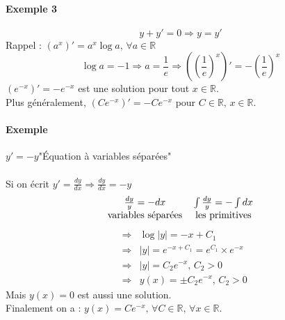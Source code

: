 \documentclass[1Opt]{report}
\begin{document}
\paragraph{Exemple 3}
\[y+y'=0\Rightarrow y=y'\]
Rappel : $(a^x)'=a^x\log{a}, \, \forall a\in{\mathbb R}$
\[\log{a}=-1\Rightarrow a=\frac{1}{e}\Rightarrow \left(\left(\frac{1}{e}\right)^x\right)'=-\left(\frac{1}{e}\right)^x\]
$(e^{-x})'=-e^{-x}$ est une solution pour tout $x\in{\mathbb R}$.\\
Plus généralement, $(Ce^{-x})'=-Ce^{-x}$ pour $C\in{\mathbb R},\,x\in{\mathbb R}$.

\paragraph{Exemple}
$y'=-y$\quad "Équation à variables séparées"\\\\
Si on écrit $y'=\frac{dy}{dx}\Rightarrow\frac{dy}{dx}=-y$\\
\begin{eqnarray*}
  \begin{tabular}{c c}
    $\frac{dy}{y}=-dx$ & $\int{\frac{dy}{y}}=-\int{dx}$ \\
    variables séparées & les primitives \\
  \end{tabular}
\end{eqnarray*}
\begin{eqnarray*}
  & \Rightarrow & \log{|y|}=-x+C_1 \\
  & \Rightarrow & |y|=e^{-x+C_1}=e^{C_1}\times e^{-x}\\
  & \Rightarrow & |y|=C_2e^{-x},\, C_2>0\\
  & \Rightarrow & y(x)=\pm C_2e^{-x},\, C_2>0
\end{eqnarray*}
Mais $y(x)=0$ est aussi une solution.\\
Finalement on a : $y(x)=Ce^{-x},\,\forall C\in{\mathbb R},\,\forall x\in{\mathbb R}$.
\end{document}
